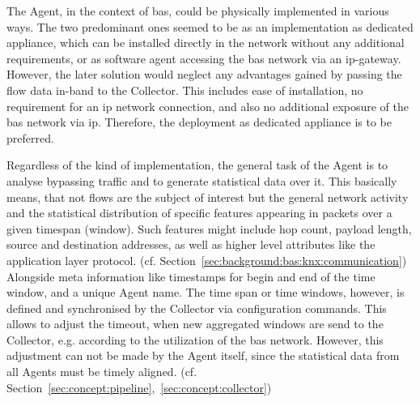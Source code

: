 The Agent, in the context of \gls{bas}, could be physically implemented in various ways.
The two predominant ones seemed to be as an implementation as dedicated appliance, which can be installed directly in the network without any additional requirements, or as software agent accessing the \gls{bas} network via an \gls{ip}-gateway.
However, the later solution would neglect any advantages gained by passing the flow data in-band to the Collector. This includes ease of installation, no requirement for an \gls{ip} network connection, and also no additional exposure of the \gls{bas} network via \gls{ip}.
Therefore, the deployment as dedicated appliance is to be preferred.

Regardless of the kind of implementation, the general task of the Agent is to analyse bypassing traffic and to generate statistical data over it.
This basically means, that not flows are the subject of interest but the general network activity and the statistical distribution of specific features appearing in packets over a given timespan (window).
Such features might include hop count, payload length, source and destination addresses, as well as higher level attributes like the application layer protocol. (cf. Section~\ref{sec:background:bas:knx:communication}) Alongside meta information like timestamps for begin and end of the time window, and a unique Agent name.
The time span or time windows, however, is defined and synchronised by the Collector via configuration commands. This allows to adjust the timeout, when new aggregated windows are send to the Collector, e.g. according to the utilization of the \gls{bas} network.
However, this adjustment can not be made by the Agent itself, since the statistical data from all Agents must be timely aligned. (cf. Section~\ref{sec:concept:pipeline},~\ref{sec:concept:collector})

